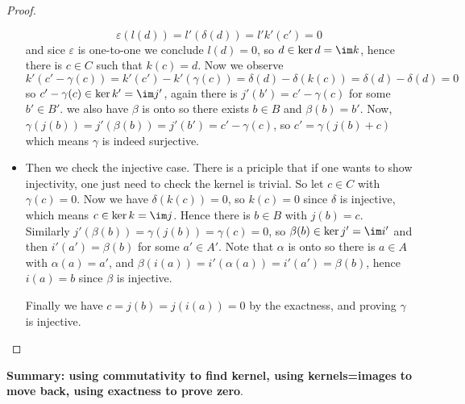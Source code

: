 \begin{proof}
\begin{itemize}
\[\varepsilon(l(d))=l'(\delta(d))=l'k'(c')=0\]
and sice $\varepsilon$ is one-to-one we conclude $l(d)=0$, so $d\in \ker d=\im k$, hence there is $c\in C$ such that $k(c)=d$. Now we observe \[k'(c'-\gamma(c))=k'(c')-k'(\gamma(c))=\delta(d)-\delta(k(c))=\delta(d)-\delta(d)=0\]
so $c'-\gamma(c)\in \ker k'=\im j'$, again there is $j'(b')=c'-\gamma(c)$ for some $b'\in B'$. we also have $\beta$ is onto so there exists $b\in B$ and $\beta(b)=b'$. Now, $\gamma(j(b))=j'(\beta(b))=j'(b')=c'-\gamma(c)$, so $c'=\gamma(j(b)+c)$ which means $\gamma$ is indeed surjective.
\item Then we check the injective case. There is a priciple that if one wants to show injectivity, one just need to check the kernel is trivial. So let $c\in C$ with $\gamma(c)=0$. Now we have $\delta(k(c))=0$, so $k(c)=0$ since $\delta$ is injective, which means $c\in \ker k=\im j$. Hence there is $b\in B$ with $j(b)=c$.\\
Similarly $j'(\beta(b))=\gamma(j(b))=\gamma(c)=0$, so $\beta(b)\in \ker j'=\im i'$ and then $i'(a')=\beta(b)$ for some $a'\in A'$. Note that $\alpha$ is onto so there is $a\in A$ with $\alpha(a)=a'$, and $\beta(i(a))=i'(\alpha(a))=i'(a')=\beta(b)$, hence $i(a)=b$ since $\beta$ is injective.\par
Finally we have $c=j(b)=j(i(a))=0$ by the exactness, and proving $\gamma$ is injective. 
\end{itemize}
\end{proof}
\textbf{Summary: using commutativity to find kernel, using kernels=images to move back, using exactness to prove zero}.